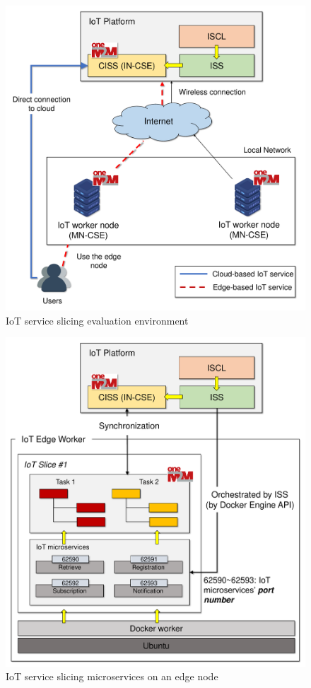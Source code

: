 \begin{figure}[tb!]
\centering
\includegraphics[width=1\columnwidth]
{figures/fig_IoT_slicing_evaluation.pdf}
\caption{IoT service slicing evaluation environment}
\label{fig:iot_service_slicing_environment}
\end{figure}

\begin{figure}[tb!]
\centering
\includegraphics[width=1\columnwidth]
{figures/fig_IoT_slicing_evaluation_docker.pdf}
\caption{IoT service slicing microservices on an edge node}
\label{fig:iot_service_slicing_environment_edge_detail}
\end{figure}

